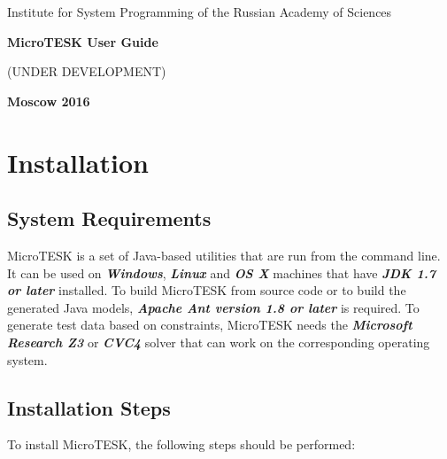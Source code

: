 \documentclass[oneside,final,14pt]{extreport}
\begin{document}
\begin{titlepage}
\begin{center}
\Large{Institute for System Programming of the Russian Academy of Sciences}

\vfill


\bf\Large{MicroTESK User Guide}

(UNDER DEVELOPMENT)

\vfill

\bf
Moscow 2016
\end{center}
\end{titlepage}


\newpage
{} %
\tableofcontents


\chapter{Installation}

\section{System Requirements}

MicroTESK is a set of Java-based utilities that are run from the command line.
It can be used on \textbf{\textit{Windows}}, \textbf{\textit{Linux}} and
\textbf{\textit{OS X}} machines that have \textbf{\textit{JDK 1.7 or later}}
installed. To build MicroTESK from source code or to build the generated
Java models, \textbf{\textit{Apache Ant version 1.8 or later}} is required.
To generate test data based on constraints, MicroTESK needs
the \textbf{\textit{Microsoft Research Z3}} or \textbf{\textit{CVC4}} solver that
can work on the corresponding operating system.

\section{Installation Steps}

To install MicroTESK, the following steps should be performed:
\end{document}

